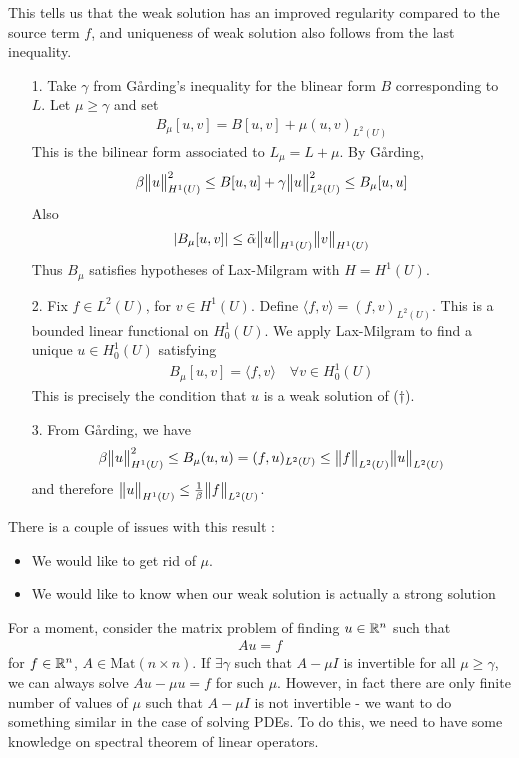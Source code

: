 \documentclass[12pt,a4paper]{report}
\newenvironment{proof}
{\begin{changemargin}{1cm}{0.5cm} 
	}%
	{\end{changemargin}
}
\begin{document}
This tells us that the weak solution has an improved regularity compared to the source term $f$, and uniqueness of weak solution also follows from the last inequality.
\begin{proof}
\pf \begin{itemize}
\item[1.] Take $\gamma$ from G{\aa}rding's inequality for the blinear form $B$ corresponding to $L$. Let $\mu \geq \gamma$ and set
\begin{align*}
B_{\mu}[u,v] = B[u,v] + \mu (u,v)_{L^2(U)}
\end{align*}
This is the bilinear form associated to $L_{\mu}  = L+\mu$. By G{\aa}rding,
\begin{align*}
\beta \bigl\lVert u\bigr\rVert_{H^1(U)}^2 \leq B[u,u] + \gamma \bigl\lVert u\bigr\rVert_{L^2(U)}^2 \leq B_{\mu} [u,u]
\end{align*}
Also
\begin{align*}
|B_{\mu}[u,v]| \leq \tilde{\alpha}\bigl\lVert u\bigr\rVert_{H^1(U)} \bigl\lVert v\bigr\rVert_{H^1(U)}
\end{align*}
Thus $B_{\mu}$ satisfies hypotheses of Lax-Milgram with $H=H^1(U)$.
\item[2.] Fix $f\in L^2(U)$, for $v\in H^1(U)$. Define $\langle f,v\rangle = (f,v)_{L^2(U)}$. This is a bounded linear functional on $H^1_0(U)$. We apply Lax-Milgram to find a unique $u\in H_0^1(U)$ satisfying
\begin{align*}
B_{\mu}[u,v] = \langle f,v\rangle \quad \forall v\in H_0^1(U)
\end{align*}
This is precisely the condition that $u$ is a weak solution of ($\dagger$).
\item[3.] From G{\aa}rding, we have
\begin{align*}
\beta \bigl\lVert u\bigr\rVert_{H^1(U)}^2 \leq B_{\mu} (u,u) = (f,u)_{L^2(U)} \leq \bigl\lVert f\bigr\rVert_{L^2(U)} \bigl\lVert u\bigr\rVert_{L^2(U)}
\end{align*}
and therefore $\bigl\lVert u\bigr\rVert_{H^1(U)} \leq \frac{1}{\beta} \bigl\lVert f\bigr\rVert_{L^2(U)}$.
\end{itemize}

\eop
\end{proof}
\s

There is a couple of issues with this result :
\begin{itemize}
\item We would like to get rid of $\mu$.
\item We would like to know when our weak solution is actually a strong solution
\end{itemize}
\s

For a moment, consider the matrix problem of finding $u\in \mathbb{R}^n$ such that
\begin{align*}
Au = f
\end{align*}
for $f\in \mathbb{R}^n$, $A\in \text{Mat}(n\times n)$. If $\exists \gamma$ such that $A- \mu I$  is invertible for all $\mu \geq \gamma$, we can always solve $Au - \mu u =f$ for such $\mu$. However, in fact there are only finite number of values of $\mu$ such that $A - \mu I$ is not invertible - we want to do something similar in the case of solving PDEs. To do this, we need to have some knowledge on spectral theorem of linear operators.
\s
\end{document}
